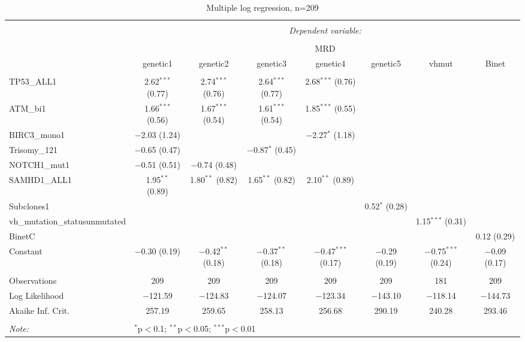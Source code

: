 \documentclass[a4paper,11pt]{article}
\begin{document}
\begin{table}[!htbp] \centering 
  \caption{Multiple log regression, n=209} 
  \label{} 
\tiny 
\begin{tabular}{@{\extracolsep{5pt}}lccccccc} 
\\[-1.8ex]\hline 
\hline \\[-1.8ex] 
 & \multicolumn{7}{c}{\textit{Dependent variable:}} \\ 
\cline{2-8} 
\\[-1.8ex] & \multicolumn{7}{c}{MRD} \\ 
 & genetic1 & genetic2 & genetic3 & genetic4 & genetic5 & vhmut & Binet \\ 
\hline \\[-1.8ex] 
 TP53\_ALL1 & 2.62$^{***}$ (0.77) & 2.74$^{***}$ (0.76) & 2.64$^{***}$ (0.77) & 2.68$^{***}$ (0.76) &  &  &  \\ 
  ATM\_bi1 & 1.66$^{***}$ (0.56) & 1.67$^{***}$ (0.54) & 1.61$^{***}$ (0.54) & 1.85$^{***}$ (0.55) &  &  &  \\ 
  BIRC3\_mono1 & $-$2.03 (1.24) &  &  & $-$2.27$^{*}$ (1.18) &  &  &  \\ 
  Trisomy\_121 & $-$0.65 (0.47) &  & $-$0.87$^{*}$ (0.45) &  &  &  &  \\ 
  NOTCH1\_mut1 & $-$0.51 (0.51) & $-$0.74 (0.48) &  &  &  &  &  \\ 
  SAMHD1\_ALL1 & 1.95$^{**}$ (0.89) & 1.80$^{**}$ (0.82) & 1.65$^{**}$ (0.82) & 2.10$^{**}$ (0.89) &  &  &  \\ 
  Subclones1 &  &  &  &  & 0.52$^{*}$ (0.28) &  &  \\ 
  vh\_mutation\_statusunmutated &  &  &  &  &  & 1.15$^{***}$ (0.31) &  \\ 
  BinetC &  &  &  &  &  &  & 0.12 (0.29) \\ 
  Constant & $-$0.30 (0.19) & $-$0.42$^{**}$ (0.18) & $-$0.37$^{**}$ (0.18) & $-$0.47$^{***}$ (0.17) & $-$0.29 (0.19) & $-$0.75$^{***}$ (0.24) & $-$0.09 (0.17) \\ 
 \hline \\[-1.8ex] 
Observations & 209 & 209 & 209 & 209 & 209 & 181 & 209 \\ 
Log Likelihood & $-$121.59 & $-$124.83 & $-$124.07 & $-$123.34 & $-$143.10 & $-$118.14 & $-$144.73 \\ 
Akaike Inf. Crit. & 257.19 & 259.65 & 258.13 & 256.68 & 290.19 & 240.28 & 293.46 \\ 
\hline 
\hline \\[-1.8ex] 
\textit{Note:}  & \multicolumn{7}{l}{$^{*}$p$<$0.1; $^{**}$p$<$0.05; $^{***}$p$<$0.01} \\ 
\end{tabular} 
\end{table} 
\end{document}
